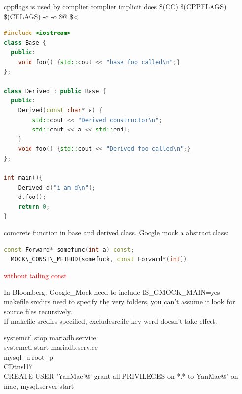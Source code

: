 \documentclass[a4paper]{tufte-handout}
\begin{document}
cppflags is used by complier
complier implicit does \$(CC) \$(CPPFLAGS) \$(CFLAGS) -c -o \$@ \$<
\begin{lstlisting}[language=c++]
#include <iostream>
class Base {
  public:
    void foo() {std::cout << "base foo called\n";}
};

class Derived : public Base {
  public:
    Derived(const char* a) {
        std::cout << "Derived constructor\n";
        std::cout << a << std::endl;
    }
    void foo() {std::cout << "Derived foo called\n";}
};

int main(){
    Derived d("i am d\n");
    d.foo();
    return 0;
}
\end{lstlisting}
comcrete function in base and derived class.
Google mock a abstract class:
\begin{lstlisting}[language=c++]
  const Forward* somefunc(int a) const;
  MOCK\_CONST\_METHOD(somefuck, const Forward*(int))
\end{lstlisting}
\textcolor{red}{without tailing const}


In Bloomberg:
Google\_Mock need to include IS\_GMOCK\_MAIN=yes\\
makefile srcdirs need to specify the very folders, you can't assume it look for source files recursively.\\
If makefile srcdirs specified, excludesrcfile key word doesn't take effect.

systemctl stop mariadb.service\\
systemctl start mariadb.service\\
mysql -u root -p\\
CDtnsl17\\
CREATE USER 'YanMac'@'%
grant all PRIVILEGES on *.* to YanMac@'%
on mac, mysql.server start
\end{document}
